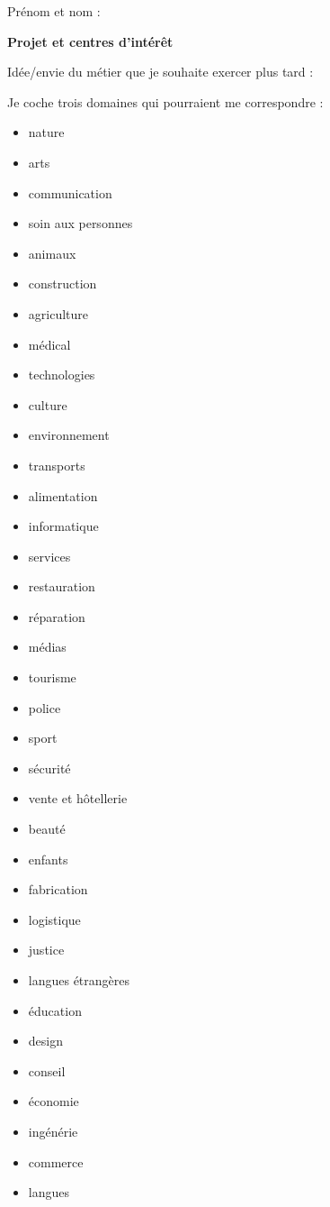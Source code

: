 \documentclass[11pt]{article}
\newcommand{\checkbox}{\(\square\)}
\newcommand{\ligne}{{\color{gray!60}\hrulefill}}
\begin{document}
\newpage
Prénom et nom : \ligne

\begin{tcolorbox}[colback=green!10!white, colframe=green!80!black]
\begin{center}
\Large\textbf{Projet et centres d’intérêt}
\end{center}
\end{tcolorbox}

Idée/envie du métier que je souhaite exercer plus tard :

\ligne

Je coche trois domaines qui pourraient me correspondre :

\begin{multicols}{3}
\begin{itemize}[label=\checkbox]
  \item nature
  \item arts
  \item communication
  \item soin aux personnes
  \item animaux
  \item construction
  \item agriculture
  \item médical
  \item technologies
  \item culture
  \item environnement
  \item transports
  \item alimentation
  \item informatique
  \item services
  \item restauration
  \item réparation
  \item médias
  \item tourisme
  \item police
  \item sport
  \item sécurité
  \item vente et hôtellerie
  \item beauté
  \item enfants
  \item fabrication
  \item logistique
  \item justice
  \item langues étrangères
  \item éducation
  \item design
  \item conseil
  \item économie
  \item ingénérie
  \item commerce
  \item langues
\end{itemize}

\end{multicols}
\end{document}
